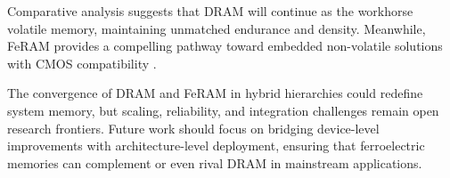 Comparative analysis suggests that DRAM will continue as the workhorse volatile memory, maintaining unmatched endurance and density. Meanwhile, FeRAM provides a compelling pathway toward embedded non-volatile solutions with CMOS compatibility \cite{noheda2023,martin2020}. 

The convergence of DRAM and FeRAM in hybrid hierarchies could redefine system memory, but scaling, reliability, and integration challenges remain open research frontiers. Future work should focus on bridging device-level improvements with architecture-level deployment, ensuring that ferroelectric memories can complement or even rival DRAM in mainstream applications.

